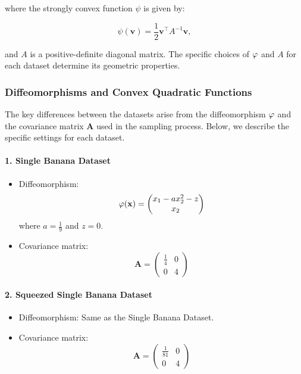 where the strongly convex function $\psi$ is given by:

\begin{equation}
    \psi(\mathbf{v}) = \frac{1}{2} \mathbf{v}^\top A^{-1} \mathbf{v},
    \label{eq:quadratic-stroco-ap}
\end{equation}

and $A$ is a positive-definite diagonal matrix. The specific choices of $\varphi$ and $A$ for each dataset determine its geometric properties.

\subsubsection{Diffeomorphisms and Convex Quadratic Functions}

The key differences between the datasets arise from the diffeomorphism $\varphi$ and the covariance matrix $\mathbf{A}$ used in the sampling process. Below, we describe the specific settings for each dataset.

\paragraph{1. Single Banana Dataset}

\begin{itemize}
    \item Diffeomorphism: 
    \[
    \varphi(\mathbf{x}) = \begin{pmatrix} 
    x_1 - a x_2^2 - z \\
    x_2 
    \end{pmatrix}
    \]
    where $a = \frac{1}{9}$ and $z = 0$.
    \item Covariance matrix:
    \[
    \mathbf{A} = \begin{pmatrix} 
    \frac{1}{4} & 0 \\
    0 & 4 
    \end{pmatrix}
    \]
\end{itemize}

\paragraph{2. Squeezed Single Banana Dataset}

\begin{itemize}
    \item Diffeomorphism: Same as the Single Banana Dataset.
    \item Covariance matrix:
    \[
    \mathbf{A} = \begin{pmatrix} 
    \frac{1}{81} & 0 \\
    0 & 4 
    \end{pmatrix}
    \]
\end{itemize}

